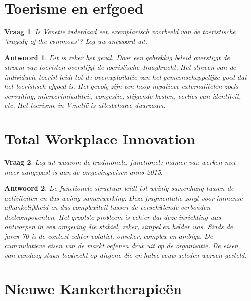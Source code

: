 \documentclass{article}
\theoremstyle{plain}
\newtheorem{question}{Vraag}
\theoremstyle{nonumberplain}
\newtheorem{answer}{Antwoord}
\begin{document}
\section{Toerisme en erfgoed}

\begin{question}
Is Venetië inderdaad een exemplarisch voorbeeld van de toeristische `tragedy of
the commons'? Leg uw antwoord uit.
\end{question}

\begin{answer}

Dit is zeker het geval. Door een gebrekkig beleid overstijgt de stroom van
toeristen overstijgt de toeristische draagkracht. Het streven van de individuele
toerist leidt tot de overexploitatie van het gemeenschappelijke goed dat het
toeristisch efgoed is. Het gevolg zijn een hoop negatieve externaliteten zoals
vervuiling, microcriminaliteit, congestie, stijgende kosten, verlies van
identiteit, etc. Het toerisme in Venetië is allesbehalve duurzaam.

\end{answer}

\section{Total Workplace Innovation}

\begin{question}
Leg uit waarom de traditionele, functionele manier van werken niet meer
aangepast is aan de omgevingseisen anno 2015.
\end{question}

\begin{answer}

De functionele structuur leidt tot weinig samenhang tussen de activiteiten en
dus weinig samenwerking. Deze fragmentatie zorgt voor immense afhankelijkheid
en dus complexiteit tussen de verschillende verbonden deelcomponenten. Het
grootste probleem is echter dat deze inrichting was ontworpen in een omgeving
die stabiel, zeker, simpel en helder was. Sinds de jaren 70 is de context echter
volatiel, onzeker, complex en ambigu. De cummulatieve eisen van de markt oefenen
druk uit op de organisatie. De eisen van vandaag staan loodrecht op diegene die
en halve eeuw geleden werden gesteld.

\end{answer}

\section{Nieuwe Kankertherapieën}
\end{document}
